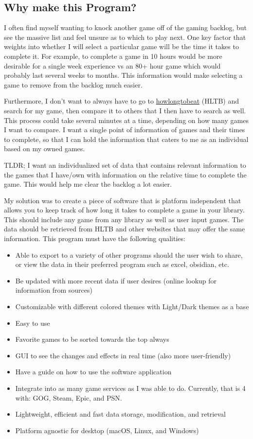\subsection{Why make this Program?}

I often find myself wanting to knock another game off of the gaming
backlog, but see the massive list and feel unsure as to which to play
next. One key factor that weights into whether I will select a
particular game will be the time it takes to complete it. For
example, to complete a game in 10 hours would be more desirable for a
single week experience vs an 80+ hour game which would probably last
several weeks to months. This information would make selecting a game
to remove from the backlog much easier.

Furthermore, I don't want to always have to go to
\href{https://howlongtobeat.com/}{howlongtobeat} (HLTB) and search for my game,
then compare it to others that I then have to search as well. This
process could take several minutes at a time, depending on how many
games I want to compare. I want a single point of information of
games and their times to complete, so that I can hold the information
that caters to me as an individual based on my owned games.

TLDR;
I want an individualized set of data that contains relevant
information to the games that I have/own with information on the
relative time to complete the game. This would help me clear
the backlog a lot easier.

My solution was to create a piece of software that is platform
independent that allows you to keep track of how long it takes to
complete a game in your library. This should include any game from
any library as well as user input games. The data should be retrieved
from HLTB and other websites that may offer the same information.
This program must have the following qualities:

\begin{itemize}
	\item Able to export to a variety of other programs should the user
		wish to share, or view the data in their preferred program such as
		excel, obsidian, etc.
	\item Be updated with more recent data if user desires (online
		lookup for information from sources)
	\item Customizable with different colored themes with Light/Dark
		themes as a base
	\item Easy to use
	\item Favorite games to be sorted towards the top always
	\item GUI to see the changes and effects in real time (also more
		user-friendly)
	\item Have a guide on how to use the software application
	\item Integrate into as many game services as I was able to do.
		Currently, that is 4 with: GOG, Steam, Epic, and PSN.
	\item Lightweight, efficient and fast data storage, modification, and retrieval
	\item Platform agnostic for desktop (macOS, Linux, and Windows)
\end{itemize}

